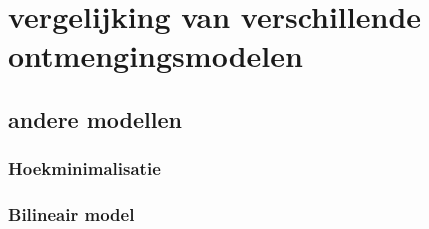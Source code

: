 \documentclass[12pt]{report}
\begin{document}






%


\chapter{vergelijking van verschillende ontmengingsmodelen}

\section{andere modellen}

\subsection{Hoekminimalisatie}

\subsection{Bilineair model}
\end{document}
